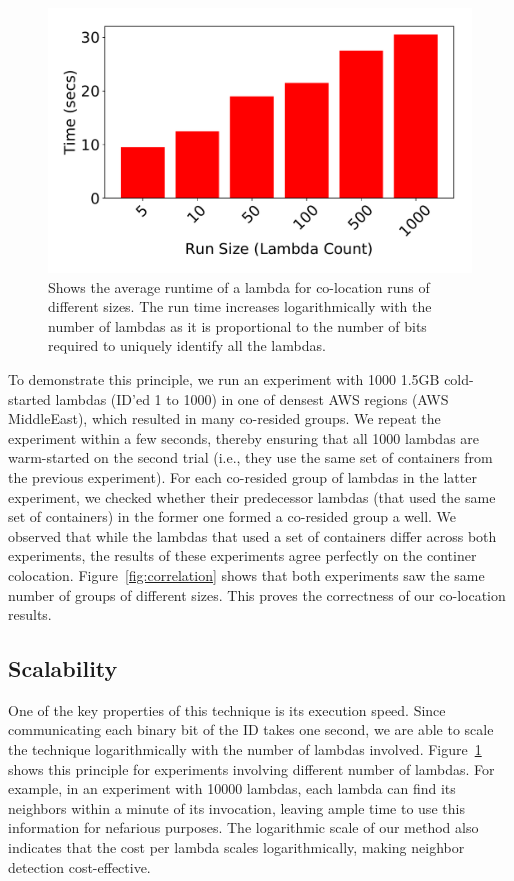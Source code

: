 \begin{figure}[!t]
  \includegraphics[width=.99\linewidth]{fig/runtimes.pdf}
  \caption{Shows the average runtime of a lambda for co-location runs of different sizes. 
  The run time increases logarithmically with the number of lambdas as it is proportional to
  the number of bits required to uniquely identify all the lambdas.
\label{fig:runtimes}}
\end{figure}

To demonstrate this principle, we run an experiment with 1000 1.5GB cold-started
lambdas (ID'ed 1 to 1000) in one of densest AWS regions (AWS MiddleEast), which
resulted in many co-resided groups.  We repeat the experiment within a few
seconds, thereby ensuring that all 1000 lambdas are warm-started on the second
trial (i.e., they use the same set of containers from the previous experiment).
For each co-resided group of lambdas in the latter experiment, we checked
whether their predecessor lambdas (that used the same set of containers) in the former one 
formed a co-resided group a well.   
We observed that while the lambdas that used a set of containers differ across 
both experiments, the results of these experiments agree perfectly on the continer 
colocation. Figure~\ref{fig:correlation} shows that both experiments saw
the same number of groups of different sizes. This proves the correctness of
our co-location results.

\subsection{Scalability}
One of the key properties of this technique is its execution speed.  Since
communicating each binary bit of the ID takes one second, we are able to scale
the technique logarithmically with the number of lambdas involved.
Figure~\ref{fig:runtimes} shows this principle for experiments involving
different number of lambdas. For example, in an experiment with 10000 lambdas,
each lambda can find its neighbors within a minute of its invocation, leaving
ample time to use this information for nefarious purposes. The logarithmic scale
of our method also indicates that the cost per lambda scales logarithmically,
making neighbor detection cost-effective.



